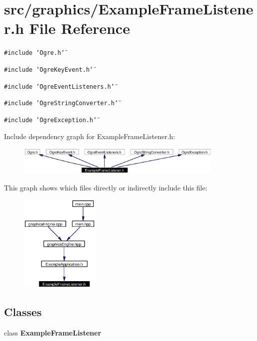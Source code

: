 \section{src/graphics/Example\-Frame\-Listener.h File Reference}
\label{ExampleFrameListener_8h}
{\tt \#include \char`\"{}Ogre.h\char`\"{}}\par
{\tt \#include \char`\"{}Ogre\-Key\-Event.h\char`\"{}}\par
{\tt \#include \char`\"{}Ogre\-Event\-Listeners.h\char`\"{}}\par
{\tt \#include \char`\"{}Ogre\-String\-Converter.h\char`\"{}}\par
{\tt \#include \char`\"{}Ogre\-Exception.h\char`\"{}}\par


Include dependency graph for Example\-Frame\-Listener.h:\begin{figure}[H]
\begin{center}
\leavevmode
\includegraphics[width=283pt]{ExampleFrameListener_8h__incl}
\end{center}
\end{figure}


This graph shows which files directly or indirectly include this file:\begin{figure}[H]
\begin{center}
\leavevmode
\includegraphics[width=107pt]{ExampleFrameListener_8h__dep__incl}
\end{center}
\end{figure}
\subsection*{Classes}
\begin{CompactItemize}
\item 
class {\bf Example\-Frame\-Listener}
\end{CompactItemize}
